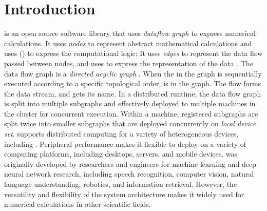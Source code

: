 \begin{savequote}[45mm]
\end{savequote}


\chapter{Introduction} 
\label{ch:introduction}

\begin{content}
\tf{} is an open source software library that uses \emph{dataflow graph}  to express numerical calculations. It uses \emph{nodes} to represent abstract mathematical calculations and uses  () to express the computational logic; It uses \emph{edges} to represent the data flow passed between nodes, and uses  to express the representation of the data . The data flow graph is a \emph{directed acyclic graph} . When the  in the graph is sequentially executed according to a specific topological order,  is in the graph. The flow forms the data  stream, and \tf{} gets its name.
In a distributed runtime, the data flow graph is split into multiple subgraphs and effectively deployed to multiple machines in the cluster for concurrent execution. Within a machine, registered subgraphs are split twice into smaller subgraphs that are deployed concurrently on \emph{local device set}. \tf{} supports distributed computing for a variety of heterogeneous devices, including  . \tf{}Peripheral performance makes it flexible to deploy on a variety of computing platforms, including desktops, servers, and mobile devices.
\tf{} was originally developed by  researchers and engineers for machine learning and deep neural network research, including speech recognition, computer vision, natural  language understanding, robotics, and information retrieval. However, the versatility and flexibility of the \tf{} system architecture makes it widely used for numerical calculations in other  scientific fields.
\end{content}


